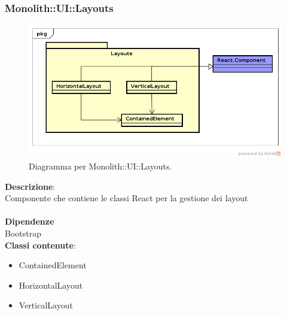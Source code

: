 \subsubsection{Monolith::UI::Layouts}
   \FloatBarrier
   \begin{figure}[ht]
   \centering
\includegraphics[width=\textwidth,keepaspectratio]{img/UI-Layouts}
   \caption{Diagramma per Monolith::UI::Layouts.}
\end{figure}
\FloatBarrier
\textbf{Descrizione}:\\
 Componente che contiene le classi React per la gestione dei layout \\\\
\textbf{Dipendenze} \\
Bootstrap 
\\ \textbf{Classi contenute}:\\
\begin{itemize}
\item ContainedElement
\item HorizontalLayout
\item VerticalLayout
\end{itemize}


\clearpage

